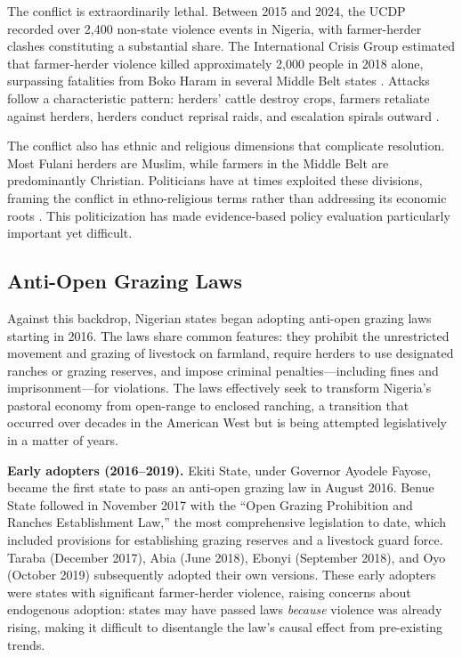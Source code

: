 \documentclass[12pt]{article}
\begin{document}
The conflict is extraordinarily lethal. Between 2015 and 2024, the UCDP recorded over 2,400 non-state violence events in Nigeria, with farmer-herder clashes constituting a substantial share. The International Crisis Group estimated that farmer-herder violence killed approximately 2,000 people in 2018 alone, surpassing fatalities from Boko Haram in several Middle Belt states \citep{icg2018stopping}. Attacks follow a characteristic pattern: herders' cattle destroy crops, farmers retaliate against herders, herders conduct reprisal raids, and escalation spirals outward \citep{dimelu2016challenges}.

The conflict also has ethnic and religious dimensions that complicate resolution. Most Fulani herders are Muslim, while farmers in the Middle Belt are predominantly Christian. Politicians have at times exploited these divisions, framing the conflict in ethno-religious terms rather than addressing its economic roots \citep{suberu2001federalism}. This politicization has made evidence-based policy evaluation particularly important yet difficult.

\subsection{Anti-Open Grazing Laws}

Against this backdrop, Nigerian states began adopting anti-open grazing laws starting in 2016. The laws share common features: they prohibit the unrestricted movement and grazing of livestock on farmland, require herders to use designated ranches or grazing reserves, and impose criminal penalties---including fines and imprisonment---for violations. The laws effectively seek to transform Nigeria's pastoral economy from open-range to enclosed ranching, a transition that occurred over decades in the American West but is being attempted legislatively in a matter of years.

\textbf{Early adopters (2016--2019).} Ekiti State, under Governor Ayodele Fayose, became the first state to pass an anti-open grazing law in August 2016. Benue State followed in November 2017 with the ``Open Grazing Prohibition and Ranches Establishment Law,'' the most comprehensive legislation to date, which included provisions for establishing grazing reserves and a livestock guard force. Taraba (December 2017), Abia (June 2018), Ebonyi (September 2018), and Oyo (October 2019) subsequently adopted their own versions. These early adopters were states with significant farmer-herder violence, raising concerns about endogenous adoption: states may have passed laws \textit{because} violence was already rising, making it difficult to disentangle the law's causal effect from pre-existing trends.
\end{document}
